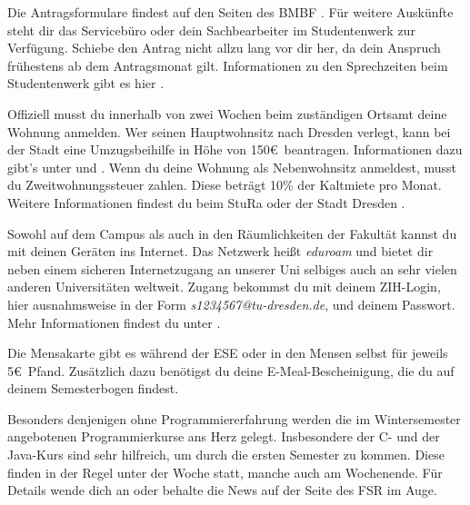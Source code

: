 \begin{itemize}[leftmargin=*]
Die Antragsformulare findest auf den Seiten des BMBF . Für weitere Auskünfte steht dir das Servicebüro oder dein Sachbearbeiter im Studentenwerk zur Verfügung.
Schiebe den Antrag nicht allzu lang vor dir her, da dein Anspruch frühestens ab dem Antragsmonat gilt.
Informationen zu den Sprechzeiten beim Studentenwerk gibt es hier .

\newpage

Offiziell musst du innerhalb von zwei Wochen beim zuständigen Ortsamt  deine Wohnung anmelden.
Wer seinen Hauptwohnsitz nach Dresden verlegt, kann bei der Stadt eine \glqq{}Umzugsbeihilfe\grqq{} in Höhe von 150\euro\ beantragen.
Informationen dazu gibt's unter  und .
Wenn du deine Wohnung als Nebenwohnsitz anmeldest, musst du Zweitwohnungssteuer zahlen. Diese beträgt 10\% der Kaltmiete pro Monat. Weitere Informationen findest du beim StuRa  oder der Stadt Dresden .

Sowohl auf dem Campus als auch in den Räumlichkeiten der Fakultät kannst du mit deinen Geräten ins Internet.
Das Netzwerk heißt \textit{eduroam} und bietet dir neben einem sicheren Internetzugang an unserer Uni selbiges auch an sehr vielen anderen Universitäten weltweit.
Zugang bekommst du mit deinem ZIH-Login, hier ausnahmsweise in der Form \textit{s1234567@tu-dresden.de}, und deinem Passwort. Mehr Informationen findest du unter .

Die Mensakarte gibt es während der ESE oder in den Mensen selbst für jeweils 5\euro\ Pfand.
Zusätzlich dazu benötigst du deine E-Meal-Bescheinigung, die du auf deinem Semesterbogen findest.

Besonders denjenigen ohne Programmiererfahrung werden die im Wintersemester angebotenen Programmierkurse ans Herz gelegt. Insbesondere der C- und der Java-Kurs sind sehr hilfreich, um durch die ersten Semester zu kommen.
Diese finden in der Regel unter der Woche statt, manche auch am Wochenende.
Für Details wende dich an  oder behalte die News auf der Seite des FSR  im Auge.


\end{itemize}
